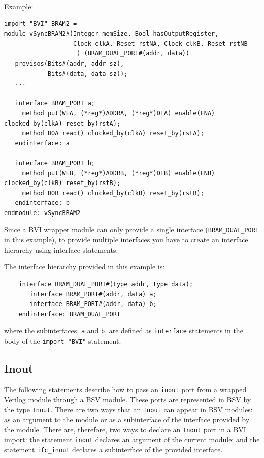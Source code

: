 \documentclass[twoside,letterpaper]{article}
\newcommand{\BSV}{BSV}
\newcommand{\te}[1]{\texttt{#1}}
\begin{document}
Example:

\begin{verbatim}
import "BVI" BRAM2 =
module vSyncBRAM2#(Integer memSize, Bool hasOutputRegister,
                   Clock clkA, Reset rstNA, Clock clkB, Reset rstNB
                    ) (BRAM_DUAL_PORT#(addr, data))
   provisos(Bits#(addr, addr_sz),
            Bits#(data, data_sz));
   ...

   interface BRAM_PORT a;
     method put(WEA, (*reg*)ADDRA, (*reg*)DIA) enable(ENA) clocked_by(clkA) reset_by(rstA);
     method DOA read() clocked_by(clkA) reset_by(rstA);
   endinterface: a

   interface BRAM_PORT b;
     method put(WEB, (*reg*)ADDRB, (*reg*)DIB) enable(ENB) clocked_by(clkB) reset_by(rstB);
     method DOB read() clocked_by(clkB) reset_by(rstB);
   endinterface: b
endmodule: vSyncBRAM2
\end{verbatim}

Since a BVI wrapper module can
only provide a single interface (\te{BRAM\_DUAL\_PORT} in this
example), to provide  multiple interfaces you have to create an
interface hierarchy using interface statements.

The  interface hierarchy provided in this example is:
\begin{verbatim}
    interface BRAM_DUAL_PORT#(type addr, type data);
       interface BRAM_PORT#(addr, data) a;
       interface BRAM_PORT#(addr, data) b;
    endinterface: BRAM_DUAL_PORT
\end{verbatim}
where the subinterfaces, \te{a} and \te{b}, are defined as
\te{interface} statements in the body of the \te{import "BVI"} statement.


\subsection{Inout}
\index{inout@\te{inout}(BVI import statement)}

The following statements describe how to pass an \te{inout} port
from a wrapped Verilog module through a BSV module.  These ports
are represented in \BSV{} by the type \te{Inout}.  There are two ways
that an \te{Inout} can appear in \BSV{} modules: as an argument to the
module or as a subinterface of the interface provided by the module.
There are, therefore, two ways to declare an \te{Inout} port in a BVI import:
the statement \te{inout} declares an argument of the current module;
and the statement \te{ifc\_inout} declares a subinterface of the
provided interface.
\end{document}
